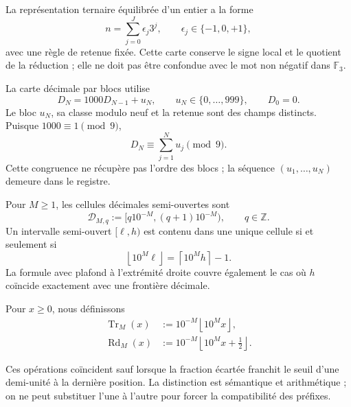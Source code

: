 La représentation ternaire équilibrée d'un entier a la forme
\begin{equation}
 n=\sum_{j=0}^{J}\epsilon_j3^j,
 \qquad
 \epsilon_j\in\{-1,0,+1\},
 \label{p12-83-c18-s1:eq:carta-ternaria-balanceada-u024}
\end{equation}
avec une règle de retenue fixée. Cette carte conserve le signe local et le
quotient de la réduction ; elle ne doit pas être confondue avec le mot non négatif dans
\(\mathbb F_3\).

La carte décimale par blocs utilise
\begin{equation}
 D_N=1000D_{N-1}+u_N,
 \qquad
 u_N\in\{0,\ldots,999\},
 \qquad D_0=0.
 \label{p12-83-c18-s1:eq:concatenacion-base-mil-u024}
\end{equation}
Le bloc \(u_N\), sa classe modulo neuf et la retenue sont des champs distincts.
Puisque \(1000\equiv1\pmod9\),
\begin{equation}
 D_N\equiv\sum_{j=1}^{N}u_j\pmod9.
 \label{p12-83-c18-s1:eq:base-mil-compatible-mod9-u024}
\end{equation}
Cette congruence ne récupère pas l'ordre des blocs ; la séquence
\((u_1,\ldots,u_N)\) demeure dans le registre.

Pour \(M\geq1\), les cellules décimales semi-ouvertes sont
\begin{equation}
 \mathcal D_{M,q}
 :=[q10^{-M},(q+1)10^{-M}),
 \qquad q\in\mathbb Z.
 \label{p12-83-c18-s1:eq:celda-decimal-semiabierta-u024}
\end{equation}
Un intervalle semi-ouvert \([\ell,h)\) est contenu dans une unique cellule si
et seulement si
\begin{equation}
 \left\lfloor10^M\ell\right\rfloor
 =\left\lceil10^Mh\right\rceil-1.
 \label{p12-83-c18-s1:eq:criterio-exacto-celda-decimal-u024}
\end{equation}
La formule avec plafond à l'extrémité droite couvre également le cas où
\(h\) coïncide exactement avec une frontière décimale.

\begin{definition}
Pour \(x\geq0\), nous définissons
\begin{align}
 \operatorname{Tr}_M(x)
 &:=10^{-M}\left\lfloor10^Mx\right\rfloor,
 \label{p12-83-c18-s1:eq:truncamiento-decimal-u024}\\
 \operatorname{Rd}_M(x)
 &:=10^{-M}\left\lfloor10^Mx+\frac12\right\rfloor.
 \label{p12-83-c18-s1:eq:redondeo-decimal-u024}
\end{align}
\end{definition}
Ces opérations coïncident sauf lorsque la fraction écartée franchit le
seuil d'une demi-unité à la dernière position. La distinction est sémantique et
arithmétique ; on ne peut substituer l'une à l'autre pour forcer la compatibilité des
préfixes.

